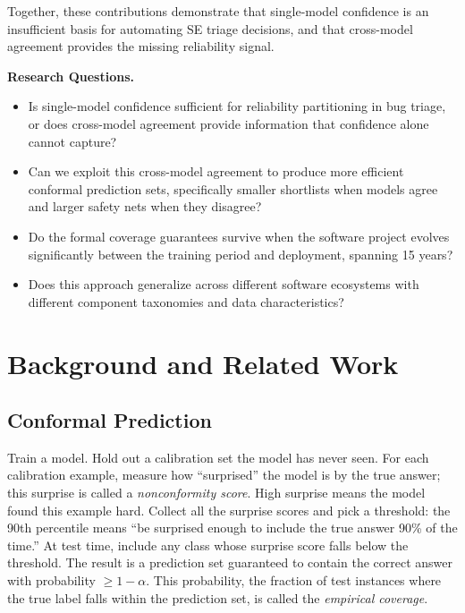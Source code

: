 \documentclass[conference]{IEEEtran}
\begin{document}
\noindent Together, these contributions demonstrate that single-model confidence is an insufficient basis for automating SE triage decisions, and that cross-model agreement provides the missing reliability signal.

\smallskip\noindent\textbf{Research Questions.}
\begin{itemize}
\item[\textbf{RQ1}] Is single-model confidence sufficient for reliability partitioning in bug triage, or does cross-model agreement provide information that confidence alone cannot capture?
\item[\textbf{RQ2}] Can we exploit this cross-model agreement to produce more efficient conformal prediction sets, specifically smaller shortlists when models agree and larger safety nets when they disagree?
\item[\textbf{RQ3}] Do the formal coverage guarantees survive when the software project evolves significantly between the training period and deployment, spanning 15 years?
\item[\textbf{RQ4}] Does this approach generalize across different software ecosystems with different component taxonomies and data characteristics?
\end{itemize}

\section{Background and Related Work}\label{sec:background}

\subsection{Conformal Prediction}\label{sec:bg-cp}

Train a model. Hold out a calibration set the model has never seen. For each calibration example, measure how ``surprised'' the model is by the true answer; this surprise is called a \emph{nonconformity score}. High surprise means the model found this example hard. Collect all the surprise scores and pick a threshold: the 90th percentile means ``be surprised enough to include the true answer 90\% of the time.'' At test time, include any class whose surprise score falls below the threshold. The result is a prediction set guaranteed to contain the correct answer with probability $\geq 1 - \alpha$. This probability, the fraction of test instances where the true label falls within the prediction set, is called the \emph{empirical coverage}.
\end{document}
